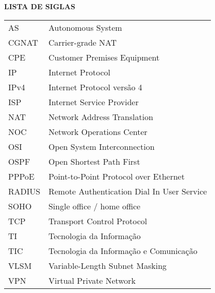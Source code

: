 \begin{center}
  \normalsize{\textbf{LISTA DE SIGLAS}}
\end{center}

\vspace{1mm}

\begin{center}
  \begin{tabular}{ m{3cm} m{10cm} }
    AS & Autonomous System \\
    CGNAT & Carrier-grade NAT \\
    CPE & Customer Premises Equipment \\
    IP & Internet Protocol \\ 
    IPv4 & Internet Protocol versão 4 \\ 
    ISP & Internet Service Provider \\ 
    NAT & Network Address Translation \\
    NOC & Network Operations Center \\ 
    OSI & Open System Interconnection \\
    OSPF & Open Shortest Path First \\
    PPPoE & Point-to-Point Protocol over Ethernet \\
    RADIUS & Remote Authentication Dial In User Service \\
    SOHO & Single office / home office \\
    TCP & Transport Control Protocol \\ 
    TI & Tecnologia da Informação \\ 
    TIC & Tecnologia da Informação e Comunicação \\ 
    VLSM & Variable-Length Subnet Masking \\ 
    VPN & Virtual Private Network \\ 
  \end{tabular}
\end{center}

